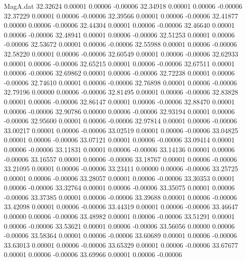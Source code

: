 \begin{filecontents}{MagA.dat}
  32.32624    0.00001    0.00006   -0.00006
  32.34918    0.00001    0.00006   -0.00006
  32.37229    0.00001    0.00006   -0.00006
  32.39566    0.00001    0.00006   -0.00006
  32.41877    0.00000    0.00006   -0.00006
  32.44304    0.00001    0.00006   -0.00006
  32.46640    0.00001    0.00006   -0.00006
  32.48941    0.00001    0.00006   -0.00006
  32.51253    0.00001    0.00006   -0.00006
  32.53672    0.00001    0.00006   -0.00006
  32.55988    0.00001    0.00006   -0.00006
  32.58220    0.00001    0.00006   -0.00006
  32.60549    0.00001    0.00006   -0.00006
  32.62933    0.00001    0.00006   -0.00006
  32.65215    0.00001    0.00006   -0.00006
  32.67511    0.00001    0.00006   -0.00006
  32.69862    0.00001    0.00006   -0.00006
  32.72238    0.00001    0.00006   -0.00006
  32.74610    0.00001    0.00006   -0.00006
  32.76898    0.00001    0.00006   -0.00006
  32.79196    0.00000    0.00006   -0.00006
  32.81495    0.00001    0.00006   -0.00006
  32.83828    0.00001    0.00006   -0.00006
  32.86147    0.00001    0.00006   -0.00006
  32.88470    0.00001    0.00006   -0.00006
  32.90786    0.00000    0.00006   -0.00006
  32.93194    0.00001    0.00006   -0.00006
  32.95600    0.00001    0.00006   -0.00006
  32.97814    0.00001    0.00006   -0.00006
  33.00217    0.00001    0.00006   -0.00006
  33.02519    0.00001    0.00006   -0.00006
  33.04825    0.00001    0.00006   -0.00006
  33.07121    0.00001    0.00006   -0.00006
  33.09414    0.00001    0.00006   -0.00006
  33.11831    0.00001    0.00006   -0.00006
  33.14136    0.00001    0.00006   -0.00006
  33.16557    0.00001    0.00006   -0.00006
  33.18767    0.00001    0.00006   -0.00006
  33.21095    0.00001    0.00006   -0.00006
  33.23411    0.00000    0.00006   -0.00006
  33.25725    0.00001    0.00006   -0.00006
  33.28057    0.00001    0.00006   -0.00006
  33.30353    0.00001    0.00006   -0.00006
  33.32764    0.00001    0.00006   -0.00006
  33.35075    0.00001    0.00006   -0.00006
  33.37385    0.00001    0.00006   -0.00006
  33.39688    0.00001    0.00006   -0.00006
  33.42098    0.00001    0.00006   -0.00006
  33.44319    0.00001    0.00006   -0.00006
  33.46647    0.00000    0.00006   -0.00006
  33.48982    0.00001    0.00006   -0.00006
  33.51291    0.00001    0.00006   -0.00006
  33.53621    0.00001    0.00006   -0.00006
  33.56056    0.00000    0.00006   -0.00006
  33.58364    0.00001    0.00006   -0.00006
  33.60689    0.00001    0.00006   -0.00006
  33.63013    0.00001    0.00006   -0.00006
  33.65329    0.00001    0.00006   -0.00006
  33.67677    0.00001    0.00006   -0.00006
  33.69966    0.00001    0.00006   -0.00006

\end{filecontents}
